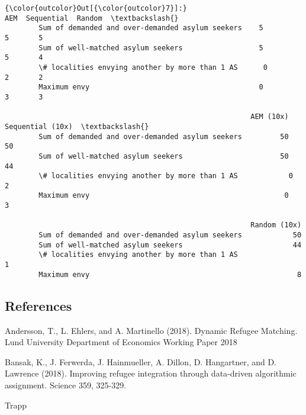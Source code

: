 \documentclass[11pt]{article}
\begin{document}
\begin{Verbatim}[commandchars=\\\{\}]
{\color{outcolor}Out[{\color{outcolor}7}]:}                                                   AEM  Sequential  Random  \textbackslash{}
        Sum of demanded and over-demanded asylum seekers    5           5       5   
        Sum of well-matched asylum seekers                  5           5       4   
        \# localities envying another by more than 1 AS      0           2       2   
        Maximum envy                                        0           3       3   
        
                                                          AEM (10x)  Sequential (10x)  \textbackslash{}
        Sum of demanded and over-demanded asylum seekers         50                50   
        Sum of well-matched asylum seekers                       50                44   
        \# localities envying another by more than 1 AS            0                 2   
        Maximum envy                                              0                 3   
        
                                                          Random (10x)  
        Sum of demanded and over-demanded asylum seekers            50  
        Sum of well-matched asylum seekers                          44  
        \# localities envying another by more than 1 AS               1  
        Maximum envy                                                 8  
\end{Verbatim}
            
    \hypertarget{references}{%
\subsection{References}\label{references}}

Andersson, T., L. Ehlers, and A. Martinello (2018). Dynamic Refugee
Matching. Lund University Department of Economics Working Paper 2018

Bansak, K., J. Ferwerda, J. Hainmueller, A. Dillon, D. Hangartner, and
D. Lawrence (2018). Improving refugee integration through data-driven
algorithmic assignment. Science 359, 325-329.

Trapp


    
    
    
    
\end{document}
